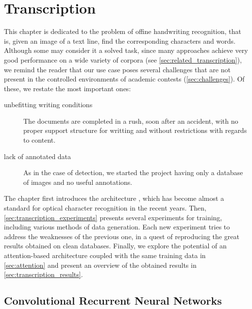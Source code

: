 
\chapter{Transcription}
\label{ch:transcription}
This chapter is dedicated to the problem of offine handwriting recognition, that is, given an image of a text line, find the corresponding characters and words. Although some may consider it a solved task, since many approaches achieve very good performance on a wide variety of corpora (see \autoref{sec:related_transcription}), we remind the reader that our use case poses several challenges that are not present in the controlled environments of academic contests (\autoref{sec:challenges}). Of these, we restate the most important ones:
\begin{description}
	\item[unbefitting writing conditions] The documents are completed in a rush, soon after an accident, with no proper support structure for writting and without restrictions with regards to content.

	\item[lack of annotated data] As in the case of detection, we started the project having only a database of images and no useful annotations.
\end{description}

The chapter first introduces the \CRNN{} architecture \citep{CRNN}, which has become almost a standard for optical character recognition in the recent years. Then, \autoref{sec:transcription_experiments} presents several experiments for training, including various methods of data generation. Each new experiment tries to address the weaknesses of the previous one, in a quest of reproducing the great results obtained on clean databases. Finally, we explore the potential of an attention-based architecture coupled with the same training data in \autoref{sec:attention} and present an overview of the obtained results in \autoref{sec:transcription_results}.


\startToDo{}


\section{Convolutional Recurrent Neural Networks}\label{sec:crnn}


